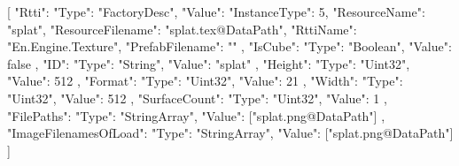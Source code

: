 [{
        "Rtti": {
            "Type": "FactoryDesc",
            "Value": {
                "InstanceType": 5,
                "ResourceName": "splat",
                "ResourceFilename": "splat.tex@DataPath",
                "RttiName": "En.Engine.Texture",
                "PrefabFilename": ""
            }
        },
        "IsCube": {
            "Type": "Boolean",
            "Value": false
        },
        "ID": {
            "Type": "String",
            "Value": "splat"
        },
        "Height": {
            "Type": "Uint32",
            "Value": 512
        },
        "Format": {
            "Type": "Uint32",
            "Value": 21
        },
        "Width": {
            "Type": "Uint32",
            "Value": 512
        },
        "SurfaceCount": {
            "Type": "Uint32",
            "Value": 1
        },
        "FilePaths": {
            "Type": "StringArray",
            "Value": ["splat.png@DataPath"]
        },
        "ImageFilenamesOfLoad": {
            "Type": "StringArray",
            "Value": ["splat.png@DataPath"]
        }
    }]